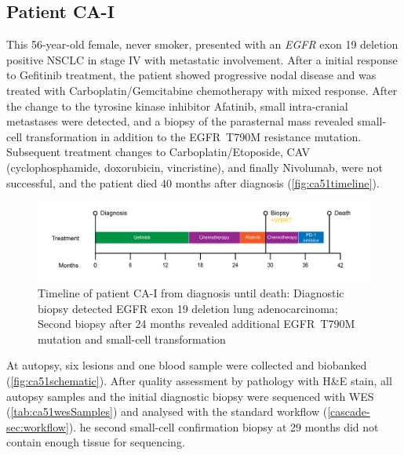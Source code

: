\cleardoublepage




\subsection{Patient CA-I}
\label{cascade-sec:CA51}

This 56-year-old female, never smoker, presented with an \textit{EGFR} exon 19 deletion positive NSCLC in stage IV with metastatic involvement. After a initial  response to Gefitinib treatment, the patient showed progressive nodal disease and was treated with Carboplatin/Gemcitabine chemotherapy with mixed response. After the change to the tyrosine kinase inhibitor Afatinib, small intra-cranial metastases were detected, and a biopsy of the parasternal mass revealed small-cell transformation in addition to the EGFR~T790M resistance mutation. Subsequent treatment changes to Carboplatin/Etoposide,  CAV (cyclophosphamide, doxorubicin, vincristine), and finally Nivolumab, were not successful, and the patient died 40 months after diagnosis (\autoref{fig:ca51timeline}).

\begin{figure}[ht]
	\centering
	\includegraphics[width=.99\linewidth]{Figures/CASCADE/CA51/CA-I_timeline}
	\caption[Timeline of patient CA-I from diagnosis until death]{Timeline of patient CA-I from diagnosis until death: Diagnostic biopsy detected EGFR exon 19 deletion lung adenocarcinoma; Second biopsy after 24 months revealed additional EGFR~T790M mutation and small-cell transformation} \label{fig:ca51timeline}
\end{figure}

At autopsy, six lesions and one blood sample were collected and biobanked (\autoref{fig:ca51schematic}). After quality assessment by pathology with H\&E stain, all autopsy samples and the initial diagnostic biopsy were sequenced with WES (\autoref{tab:ca51wesSamples}) and analysed with the standard workflow (\autoref{cascade-sec:workflow}). he second small-cell confirmation biopsy at 29 months did not contain enough tissue for sequencing.

